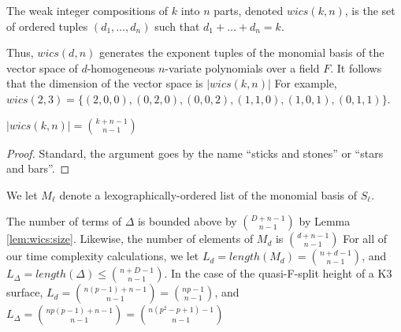 


\begin{defn}
    The weak integer compositions of $k$ into $n$ parts, denoted $wics(k, n)$, is the set of ordered tuples 
	\((d_{1}, \ldots, d_{n})\) such that \(d_{1} + \ldots + d_{n} = k\).
\end{defn}

Thus, $wics(d, n)$ generates the exponent tuples of the monomial basis of the vector space of $d$-homogeneous $n$-variate polynomials over a field $F$.
It follows that the dimension of the vector space is $|wics(k, n)|$
For example, %
$wics(2, 3) = \lbrace (2, 0, 0), (0, 2, 0), (0, 0, 2), (1, 1, 0), (1, 0, 1), (0, 1, 1) \rbrace$.
\begin{lem}
    \label{lem:wics:size}
    $|wics(k, n)| = \binom{k + n - 1}{n - 1}$
\end{lem}

\begin{proof}
	Standard, the argument goes by the name ``sticks and stones'' or ``stars and bars''.
\end{proof}

We let \(M_{\ell}\) denote a lexographically-ordered list
of the monomial basis of \(S_{\ell}\).

\begin{rmk}
    The number of terms of \(\Delta\) is bounded 
    above by \(\binom{D+n-1}{n-1}\) by Lemma \ref{lem:wics:size}.
    Likewise, the number of elements of 
    \(M_{d}\) is \(\binom{d+n-1}{n-1}\)
    For all of our time complexity calculations, 
    we let $L_{d} = length(M_{d}) = \binom{n + d - 1}{n - 1}$, and $L_{\Delta} = length(\Delta) \leq \binom{n + D - 1}{n - 1}$.
    In the case of the quasi-F-split height of a K3 surface, 
    $L_{d} = \binom{n(p - 1) + n - 1}{n - 1} = \binom{np - 1}{n - 1}$, 
    and $L_{\Delta} = \binom{np(p - 1) + n - 1}{n - 1} = \binom{n(p^2 - p + 1) - 1}{n - 1}$
\end{rmk}

